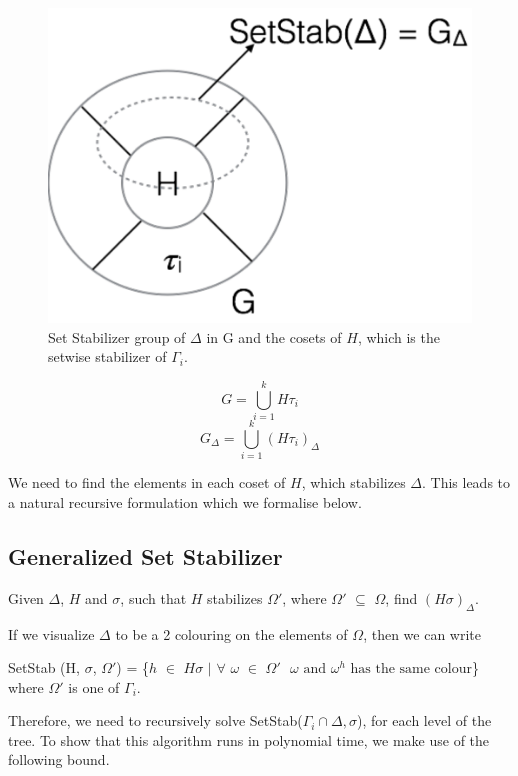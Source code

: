 \begin{figure}[htp!]
	\centering
	\includegraphics[scale=0.5]{images/setstabgroup.pdf}
	\caption{Set Stabilizer group of $\Delta$ in G and the cosets of $H$, which is the setwise stabilizer of $\Gamma_{i}$.}
	\label{fig:setstabgroup}
\end{figure}

\[ G =  \bigcup_{i=1}^kH\tau_{i} \]
\[ G_{\Delta} = \bigcup_{i=1}^k(H\tau_{i})_{\Delta} \]

We need to find the elements in each coset of $H$, which stabilizes $\Delta$. This leads to a natural recursive formulation which we formalise below. 

\subsection{Generalized Set Stabilizer} 
Given $\Delta$, $H$ and $\sigma$, such that $H$ stabilizes $\Omega'$, where $\Omega'$ $\subseteq$ $\Omega$, find $(H\sigma)_{\Delta}$. 

If we visualize $\Delta$ to be a 2 colouring on the elements of $\Omega$, then we can write
\begin{center}
SetStab (H, $\sigma$, $\Omega'$) = \{$h$ $\in$ $H\sigma$ $|$ $\forall$ $\omega$ $\in$ $\Omega' \text{ $\omega$ and $\omega^{h}$ has the same colour}$\}
where $\Omega'$ is one of $\Gamma_{i}$.
\end{center}

Therefore, we need to recursively solve SetStab($\Gamma_{i} \cap \Delta, \sigma$), for each level of the tree. To show that this algorithm runs in polynomial time, we make use of the following bound.

